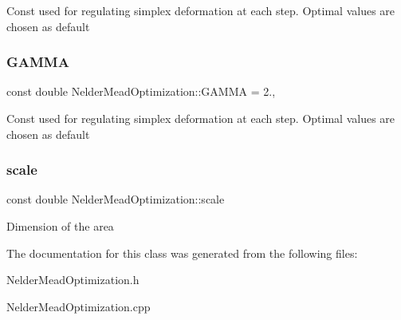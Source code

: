 Const used for regulating simplex deformation at each step. Optimal values are chosen as default \mbox{\label{class_nelder_mead_optimization_a67af6800fbfe027f51fd94052b87d615}} 
\subsubsection{\texorpdfstring{G\+A\+M\+MA}{GAMMA}}
{\footnotesize\ttfamily const double Nelder\+Mead\+Optimization\+::\+G\+A\+M\+MA = 2.\hspace{0.3cm}{\ttfamily [static]}, {\ttfamily [private]}}

Const used for regulating simplex deformation at each step. Optimal values are chosen as default \mbox{\label{class_nelder_mead_optimization_aadfa64f4a2f44f60755d7d40d912a53f}} 
\subsubsection{\texorpdfstring{scale}{scale}}
{\footnotesize\ttfamily const double Nelder\+Mead\+Optimization\+::scale\hspace{0.3cm}{\ttfamily [private]}}

Dimension of the area 

The documentation for this class was generated from the following files\+:\begin{DoxyCompactItemize}
\item 
Nelder\+Mead\+Optimization.\+h\item 
Nelder\+Mead\+Optimization.\+cpp\end{DoxyCompactItemize}
